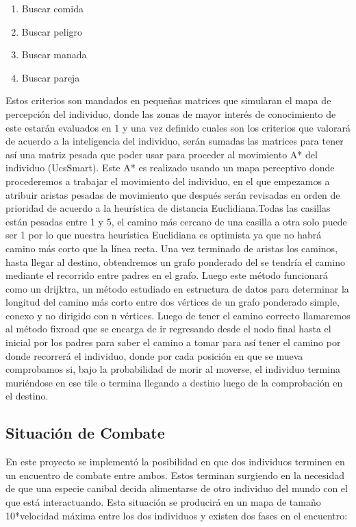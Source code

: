 \documentclass{llncs}
\begin{document}
\begin{enumerate}
	\item Buscar comida
	\item Buscar peligro
	\item Buscar manada
	\item Buscar pareja
\end{enumerate}

Estos criterios son mandados en pequeñas matrices que simularan el mapa de percepción del individuo, donde las zonas de mayor interés de conocimiento de este estarán evaluados en 1 y una vez definido cuales son los criterios que valorará de acuerdo a la inteligencia del individuo, serán sumadas las matrices para tener así una matriz pesada que poder usar para proceder al movimiento A* del individuo (UcsSmart).
\newline
\newline
Este A* es realizado usando un mapa perceptivo donde procederemos a trabajar el movimiento del individuo, en el que empezamos a atribuir aristas pesadas de movimiento que después serán revisadas en orden de prioridad de acuerdo a la heurística de distancia Euclidiana.Todas las casillas están pesadas entre 1 y 5, el camino más cercano de una casilla a otra solo puede ser 1 por lo que nuestra heurística Euclidiana es optimista ya que no habrá camino más corto que la línea recta.
\newline
\newline
Una vez terminado de aristas los caminos, hasta llegar al destino, obtendremos un grafo ponderado del se tendría el camino mediante el recorrido entre padres en el grafo.
\newline
\newline
Luego este método funcionará como un drijktra, un método estudiado en estructura
de datos para determinar la longitud del camino más corto entre dos vértices de
un grafo ponderado simple, conexo y no dirigido con n vértices. Luego de tener el camino correcto llamaremos al método fixroad que se encarga de ir regresando desde el nodo final hasta el inicial por los padres para saber el camino a tomar para así tener el camino por donde recorrerá el individuo, donde por cada posición en que se mueva comprobamos si, bajo la probabilidad de morir al moverse, el individuo termina muriéndose en ese tile o termina llegando a destino luego de la comprobación en el destino.


\subsection{Situación de Combate}
En este proyecto se implementó la posibilidad en que dos individuos terminen en un encuentro de combate entre ambos. Estos terminan surgiendo en la necesidad de que una especie canibal decida alimentarse de otro individuo del mundo con el que está interactuando. Esta situación se producirá en un mapa de tamaño 10*velocidad máxima entre los dos individuos y existen dos fases en el encuentro: 
\end{document}
